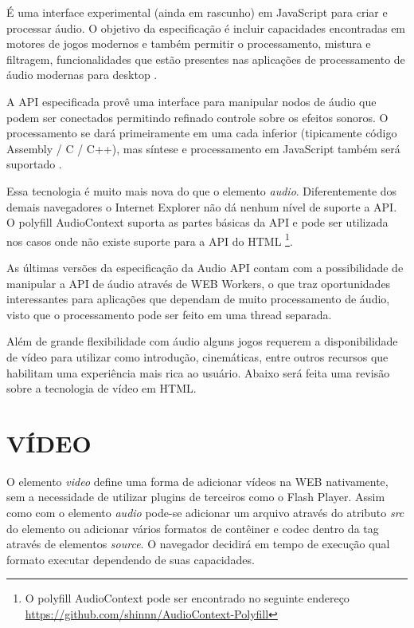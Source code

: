 É uma interface experimental (ainda em rascunho) em JavaScript para
criar e processar áudio. O objetivo da especificação é incluir
capacidades encontradas em motores de jogos modernos e também permitir
o processamento, mistura e filtragem, funcionalidades que estão
presentes nas aplicações de processamento de áudio modernas para
desktop \autocite{audioApiSpec}.

A API especificada provê uma interface para manipular nodos de
áudio que podem ser conectados permitindo refinado controle sobre os
efeitos sonoros. O processamento se dará primeiramente em uma cada
inferior (tipicamente código Assembly / C / C++), mas síntese e
processamento em JavaScript também será suportado \autocite{audioApiSpec}.

Essa tecnologia é muito mais nova do que o elemento \textit{audio}.
Diferentemente dos demais navegadores o Internet Explorer não
dá nenhum nível de suporte a API. O polyfill AudioContext
suporta as partes básicas da API e pode ser utilizada nos
casos onde não existe suporte para a API do HTML \footnote{O
polyfill AudioContext pode ser encontrado no seguinte endereço
\url{https://github.com/shinnn/AudioContext-Polyfill}}.

As últimas versões da especificação da Audio API contam com a
possibilidade de manipular a API de áudio através de WEB Workers, o
que traz oportunidades interessantes para aplicações que dependam de
muito processamento de áudio, visto que o processamento pode ser
feito em uma thread separada.

Além de grande flexibilidade com áudio alguns jogos requerem a
disponibilidade de vídeo para utilizar como introdução, cinemáticas,
entre outros recursos que habilitam uma experiência mais rica ao
usuário. Abaixo será feita uma revisão sobre a tecnologia de vídeo
em HTML.

\section{VÍDEO}

O elemento \textit{video} define uma forma de adicionar vídeos na
WEB nativamente, sem a necessidade de utilizar plugins de terceiros
como o Flash Player. Assim como com o elemento \textit{audio} pode-se
adicionar um arquivo através do atributo \textit{src} do elemento
ou adicionar vários formatos de contêiner e codec dentro da tag
através de elementos \textit{source}. O navegador decidirá em tempo de
execução qual formato executar dependendo de suas capacidades.

